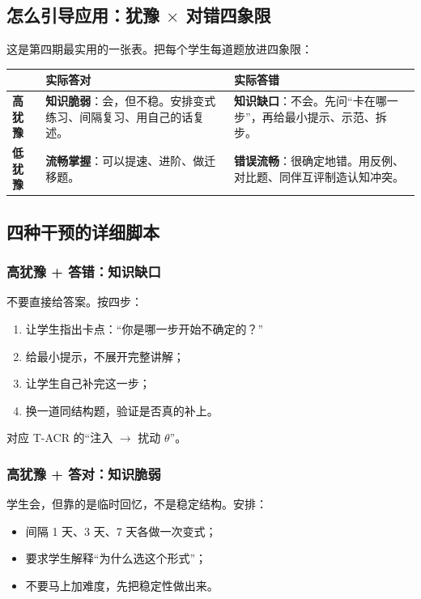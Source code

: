 \documentclass[UTF8,a4paper,11pt]{ctexart}
\begin{document}
\subsection{怎么引导应用：犹豫 $\times$ 对错四象限}

这是第四期最实用的一张表。把每个学生每道题放进四象限：

\begin{center}
\begin{longtable}{@{}p{2.4cm}p{5.2cm}p{5.4cm}@{}}
\toprule
 & \textbf{实际答对} & \textbf{实际答错} \\
\midrule
\textbf{高犹豫} & \textbf{知识脆弱}：会，但不稳。安排变式练习、间隔复习、用自己的话复述。 & \textbf{知识缺口}：不会。先问“卡在哪一步”，再给最小提示、示范、拆步。 \\
\textbf{低犹豫} & \textbf{流畅掌握}：可以提速、进阶、做迁移题。 & \textbf{错误流畅}：很确定地错。用反例、对比题、同伴互评制造认知冲突。 \\
\bottomrule
\end{longtable}
\end{center}

\subsection{四种干预的详细脚本}

\subsubsection{高犹豫 + 答错：知识缺口}

不要直接给答案。按四步：

\begin{enumerate}[leftmargin=2em]
\item 让学生指出卡点：“你是哪一步开始不确定的？”
\item 给最小提示，不展开完整讲解；
\item 让学生自己补完这一步；
\item 换一道同结构题，验证是否真的补上。
\end{enumerate}

对应 T-ACR 的“注入 $\to$ 扰动 $\theta$”。

\subsubsection{高犹豫 + 答对：知识脆弱}

学生会，但靠的是临时回忆，不是稳定结构。安排：

\begin{itemize}[leftmargin=2em]
\item 间隔 1 天、3 天、7 天各做一次变式；
\item 要求学生解释“为什么选这个形式”；
\item 不要马上加难度，先把稳定性做出来。
\end{itemize}
\end{document}
